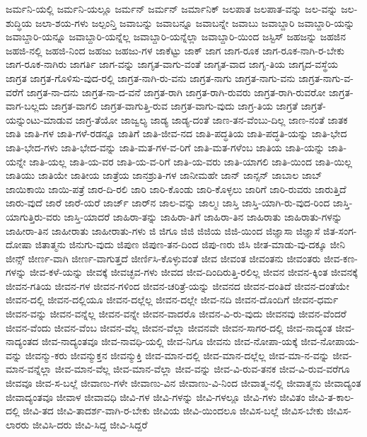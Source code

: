 {ಜರ್ಮನಿ-ಯಲ್ಲಿ
ಜರ್ಮನಿ-ಯಲ್ಲೂ
ಜರ್ಮನ್
ಜರ್ಮನ್‌
ಜರ್ಮಾನಿಕ್
ಜಲಪಾತ
ಜಲಪಾತ-ವನ್ನು
ಜಲ-ವನ್ನು
ಜಲ-ಶುದ್ಧಿಯ
ಜಲಾ-ಶಯ-ಗಳು
ಜಲ್ಪಂನ್ತಿ
ಜವಾಬನ್ನು
ಜವಾಬನ್ನೂ
ಜವಾಬನ್ನೇ
ಜವಾಬು
ಜವಾಬ್ದಾರಿ
ಜವಾಬ್ದಾರಿ-ಯನ್ನು
ಜವಾಬ್ದಾರಿ-ಯನ್ನೂ
ಜವಾಬ್ದಾರಿ-ಯನ್ನೆಲ್ಲ
ಜವಾಬ್ದಾರಿ-ಯನ್ನೆಲ್ಲಾ
ಜವಾಬ್ದಾರಿ-ಯಿಂದ
ಜಸ್ಟಿಸ್
ಜಹಜನ್ನು
ಜಹಜಿನ
ಜಹಜಿ-ನಲ್ಲಿ
ಜಹಜಿ-ನಿಂದ
ಜಹಜು
ಜಹಜು-ಗಳ
ಜಾಕೆಟ್ಟು
ಜಾಕ್
ಜಾಗ
ಜಾಗ-ರೂಕ
ಜಾಗ-ರೂಕ-ನಾಗಿ-ರ-ಬೇಕು
ಜಾಗ-ರೂಕ-ನಾಗಿರು
ಜಾಗರ್ತಿ
ಜಾಗ-ವನ್ನು
ಜಾಗೃತ-ವಾಗು-ವಂತೆ
ಜಾಗೃತ-ವಾದ
ಜಾಗೃ-ತಿಯ
ಜಾಗೃದ-ವಸ್ಥೆಯ
ಜಾಗ್ರತ
ಜಾಗ್ರತ-ಗೊಳಿಸು-ವುದ-ರಲ್ಲಿ
ಜಾಗ್ರತ-ನಾಗಿ-ರು-ವನು
ಜಾಗ್ರತ-ನಾಗು
ಜಾಗ್ರತ-ನಾಗು-ವನು
ಜಾಗ್ರತ-ನಾಗು-ವ-ವರೆಗೆ
ಜಾಗ್ರತ-ನಾ-ದನು
ಜಾಗ್ರತ-ನಾ-ದ-ವನೆ
ಜಾಗ್ರತ-ರಾಗಿ
ಜಾಗ್ರತ-ರಾಗಿ-ರುವರು
ಜಾಗ್ರತ-ರಾಗಿ-ರುವರೋ
ಜಾಗ್ರತ-ವಾಗ-ಬಲ್ಲದು
ಜಾಗ್ರತ-ವಾಗಲಿ
ಜಾಗ್ರತ-ವಾಗುತ್ತಿ-ರುವ
ಜಾಗ್ರತ-ವಾಗು-ವುದು
ಜಾಗ್ರ-ತಿಯ
ಜಾಗ್ರತೆ
ಜಾಗ್ರತೆ-ಯನ್ನುಂಟು-ಮಾಡುವ
ಜಾಗ್ರ-ತೆಯೋ
ಜಾಜ್ವಲ್ಯ
ಜಾಡ್ಯ
ಜಾಡ್ಯ-ದಂತೆ
ಜಾಣ-ತನ-ವೆಂಬು-ದಿಲ್ಲ
ಜಾಣ-ನಂತೆ
ಜಾತಕ
ಜಾತಿ
ಜಾತಿ-ಗಳ
ಜಾತಿ-ಗಳೆ-ರಡನ್ನೂ
ಜಾತಿಗೆ
ಜಾತಿ-ಜೀವ-ನದ
ಜಾತಿ-ಪದ್ಧತಿಯ
ಜಾತಿ-ಪದ್ಧತಿ-ಯನ್ನು
ಜಾತಿ-ಭೇದ
ಜಾತಿ-ಭೇದ-ಗಳು
ಜಾತಿ-ಭೇದ-ವನ್ನು
ಜಾತಿ-ಮತ-ಗಳ-ವ-ರಿಗೆ
ಜಾತಿ-ಮತ-ಗಳೆಂಬ
ಜಾತಿಯ
ಜಾತಿ-ಯನ್ನು
ಜಾತಿ-ಯನ್ನೇ
ಜಾತಿ-ಯಲ್ಲ
ಜಾತಿ-ಯ-ವರ
ಜಾತಿ-ಯ-ವ-ರಿಗೆ
ಜಾತಿ-ಯ-ವರು
ಜಾತಿ-ಯಾಗಲಿ
ಜಾತಿ-ಯಿಂದ
ಜಾತಿ-ಯಿಲ್ಲ
ಜಾತಿಯು
ಜಾತಿಯೇ
ಜಾತೀಯ
ಜಾತ್ರೆಯ
ಜಾನಶ್ರುತಿ-ಗಳ
ಜಾನೀಮಹೇ
ಜಾನ್
ಜಾನ್ಸನ್
ಜಾಬಾಲ
ಜಾಬ್
ಜಾಯಿಕಾಯಿ
ಜಾಯಿ-ಪತ್ರೆ
ಜಾರ-ದಿ-ರಲಿ
ಜಾರಿ
ಜಾರಿ-ಕೊಂಡು
ಜಾರಿ-ಕೊಳ್ಳಲು
ಜಾರಿಗೆ
ಜಾರಿ-ರುವರು
ಜಾರುತ್ತಿದೆ
ಜಾರು-ವುದೆ
ಜಾರೆ
ಜಾರೆ-ಯರೆ
ಜಾರ್ಜ್
ಜಾರ್‌ನ
ಜಾಲ-ವನ್ನು
ಜಾಲ್ಮಃ
ಜಾಸ್ತಿ
ಜಾಸ್ತಿ-ಯಾಗಿ-ರು-ವುದ-ರಿಂದ
ಜಾಸ್ತಿ-ಯಾಗುತ್ತಿರು-ವರು
ಜಾಸ್ತಿ-ಯಾದರೆ
ಜಾಹಿರಾ-ತನ್ನು
ಜಾಹಿರಾ-ತಿಗೆ
ಜಾಹಿರಾ-ತಿನ
ಜಾಹಿರಾತು
ಜಾಹಿರಾತು-ಗಳನ್ನು
ಜಾಹೀರಾ-ತಿನ
ಜಾಹೀರಾತು
ಜಾಹೀರಾತು-ಗಳು
ಜಿ
ಜಿಗೂ
ಜಿಜಿ
ಜಿಜಿಯ
ಜಿಜಿ-ಯಿಂದ
ಜಿಜ್ಞಾಸಾ
ಜಿಜ್ಞಾಸೆ
ಜಿತ-ಸಂಗ-ದೋಷಾ
ಜಿತಾತ್ಮನು
ಜಿನುಗು-ವುದು
ಜಿಪುಣ
ಜಿಪುಣ-ತನ-ದಿಂದ
ಜಿಪು-ಣರು
ಜಿಸಿ
ಜೀತ-ಮಾಡು-ವು-ದಕ್ಕೂ
ಜೀನಿ
ಜೀನ್ಸ್
ಜೀರ್ಣ-ವಾಗಿ
ಜೀರ್ಣ-ವಾಗುತ್ತದೆ
ಜೀರ್ಣಿಸಿ-ಕೊಳ್ಳುವಂತೆ
ಜೀವ
ಜೀವಂತ
ಜೀವಂತನು
ಜೀವಂತರು
ಜೀವ-ಕಣ-ಗಳನ್ನು
ಜೀವ-ಕಳೆ-ಯನ್ನು
ಜೀವಕ್ಕೆ
ಜೀವಚ್ಛವ-ಗಳು
ಜೀವದ
ಜೀವ-ದಿಂದಿರುತ್ತಿ-ರಲಿಲ್ಲ
ಜೀವನ
ಜೀವನ-ಕ್ಕಿಂತ
ಜೀವನಕ್ಕೆ
ಜೀವನ-ಗತಿಯ
ಜೀವನ-ಗಳ
ಜೀವನ-ಗಳಿಂದ
ಜೀವನ-ಚರಿತ್ರೆ-ಯನ್ನು
ಜೀವನದ
ಜೀವನ-ದಂತಿದೆ
ಜೀವನ-ದಂತೆಯೇ
ಜೀವನ-ದಲ್ಲಿ
ಜೀವನ-ದಲ್ಲಿಯೂ
ಜೀವನ-ದಲ್ಲೆಲ್ಲ
ಜೀವನ-ದಲ್ಲೇ
ಜೀವ-ನದಿ
ಜೀವನ-ದೊಂದಿಗೆ
ಜೀವನ-ಧರ್ಮ
ಜೀವನ-ವನ್ನು
ಜೀವನ-ವನ್ನೆಲ್ಲ
ಜೀವನ-ವನ್ನೇ
ಜೀವನ-ವಾದರೊ
ಜೀವನ-ವಿ-ರು-ವುದು
ಜೀವನವು
ಜೀವನ-ವೆಂದರೆ
ಜೀವನ-ವೆಂದು
ಜೀವನ-ವೆಂಬ
ಜೀವನ-ವೆಲ್ಲ
ಜೀವನ-ವೆಲ್ಲಾ
ಜೀವನವೇ
ಜೀವನ-ಸಾಗರ-ದಲ್ಲಿ
ಜೀವ-ನಾದ್ಯಂತ
ಜೀವ-ನಾದ್ಯಂತದ
ಜೀವ-ನಾದ್ಯಂತವೂ
ಜೀವ-ನಾವಧಿ-ಯಲ್ಲಿ
ಜೀವ-ನಿಗೂ
ಜೀವನು
ಜೀವ-ನೋಪಾ-ಯಕ್ಕೆ
ಜೀವ-ನೋಪಾಯ-ವನ್ನು
ಜೀವನ್ಮು-ಕರು
ಜೀವನ್ಮುಕ್ತನ
ಜೀವನ್ಮುಕ್ತಿ
ಜೀವ-ಮಾನ-ದಲ್ಲಿ
ಜೀವ-ಮಾನ-ದಲ್ಲೆಲ್ಲ
ಜೀವ-ಮಾ-ನ-ವನ್ನು
ಜೀವ-ಮಾನ-ವನ್ನೆಲ್ಲಾ
ಜೀವ-ಮಾನ-ವೆಲ್ಲ
ಜೀವ-ಮಾನ-ವೆಲ್ಲಾ
ಜೀವ-ವನ್ನು
ಜೀವ-ವಿ-ರುವ-ತನಕ
ಜೀವ-ವಿ-ರುವ-ವರೆಗೂ
ಜೀವವೂ
ಜೀವ-ಸ-ಬಲ್ಲೆ
ಜೀವಾಣು-ಗಳೇ
ಜೀವಾಣು-ವಿನ
ಜೀವಾಣು-ವಿ-ನಿಂದ
ಜೀವಾತ್ಮ-ನಲ್ಲಿ
ಜೀವಾತ್ಮನು
ಜೀವಾದ್ಯಂತ
ಜೀವಾದ್ಯಂತವೂ
ಜೀವಾಳ
ಜೀವಾವಧಿ
ಜೀವಿ-ಗಳ
ಜೀವಿ-ಗಳನ್ನು
ಜೀವಿ-ಗಳಲ್ಲೂ
ಜೀವಿ-ಗಳು
ಜೀವಿತಂ
ಜೀವಿ-ತ-ಕಾಲ-ದಲ್ಲಿ
ಜೀವಿ-ತದ
ಜೀವಿ-ತಾದರ್ಶ-ವಾಗಿ-ರ-ಬೇಕು
ಜೀವಿಯ
ಜೀವಿ-ಯಿಂದಲೂ
ಜೀವಿಸ-ಬಲ್ಲೆ
ಜೀವಿಸ-ಬೇಕು
ಜೀವಿಸ-ಲಾರರು
ಜೀವಿಸಿ-ದರು
ಜೀವಿ-ಸಿದ್ದ
ಜೀವಿ-ಸಿದ್ದರೆ
}
